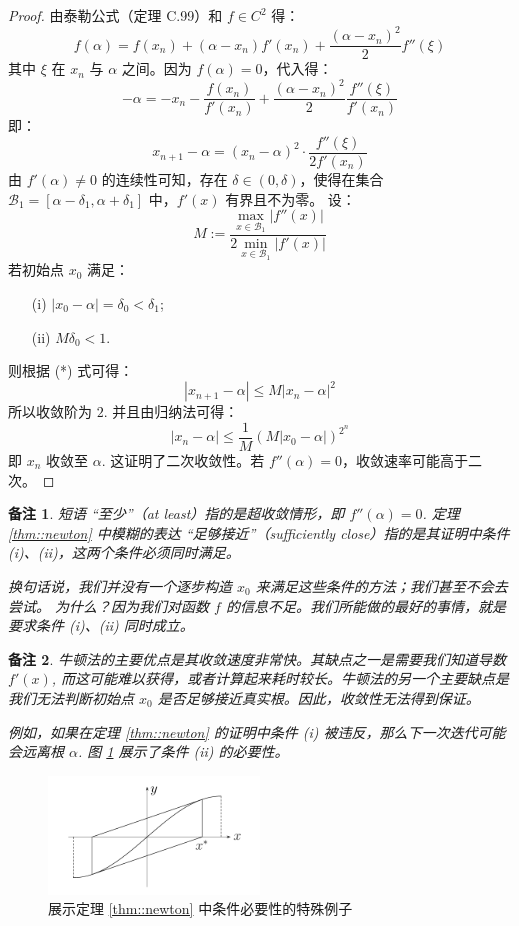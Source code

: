 \documentclass[a4paper]{ctexart}
\newtheorem{remark}{备注}
\numberwithin{theorem}{section}
\numberwithin{equation}{section}
\numberwithin{figure}{section}
\numberwithin{remark}{section}
\begin{document}
\begin{proof}
由泰勒公式（定理 C.99）和 \(f \in C^2\) 得：
\[
f(\alpha) = f(x_n) + (\alpha - x_n) f'(x_n) + \frac{(\alpha - x_n)^2}{2} f''(\xi)
\]
其中 \(\xi\) 在 \(x_n\) 与 \(\alpha\) 之间。因为 \(f(\alpha) = 0\)，代入得：
\[
- \alpha = - x_n - \frac{f(x_n)}{f'(x_n)} + \frac{(\alpha - x_n)^2}{2} \frac{f''(\xi)}{f'(x_n)}
\]
即：
\[
x_{n+1} - \alpha = (x_n - \alpha)^2 \cdot \frac{f''(\xi)}{2f'(x_n)} \tag{*}
\]
由 \(f'(\alpha) \ne 0\) 的连续性可知，存在 \(\delta \in (0, \delta)\)，使得在集合 
\(\mathcal{B}_1 = [\alpha - \delta_1, \alpha + \delta_1]\) 中，\(f'(x)\) 有界且不为零。
设：
\[
M := \frac{\max_{x \in \mathcal{B}_1} |f''(x)|}{2 \min_{x \in \mathcal{B}_1} |f'(x)|}
\]
若初始点 \(x_0\) 满足：
\begin{itemize}
    \item[(i)] \(|x_0 - \alpha| = \delta_0 < \delta_1\);
    \item[(ii)] \(M \delta_0 < 1\).
\end{itemize}
则根据 (*) 式可得：
\[
|x_{n+1} - \alpha| \le M |x_n - \alpha|^2
\]
所以收敛阶为 $2$. 并且由归纳法可得：
\[
|x_n - \alpha| \le \frac{1}{M} (M |x_0 - \alpha|)^{2^n}
\]
即 $x_n$ 收敛至 $\alpha$. 这证明了二次收敛性。若 \(f''(\alpha) = 0\)，收敛速率可能高于二次。 
\end{proof}

\begin{remark}
短语 “至少”（at least）指的是超收敛情形，即 \( f''(\alpha) = 0 \). 
定理 \ref{thm::newton} 中模糊的表达 “足够接近”（sufficiently close）指的是其证明中条件 (i)、(ii)，这两个条件必须同时满足。

换句话说，我们并没有一个逐步构造 \( x_0 \) 来满足这些条件的方法；我们甚至不会去尝试。
为什么？因为我们对函数 \( f \) 的信息不足。我们所能做的最好的事情，就是要求条件 (i)、(ii) 同时成立。
\end{remark}

\begin{remark}
牛顿法的主要优点是其收敛速度非常快。其缺点之一是需要我们知道导数 \( f'(x) \), 
而这可能难以获得，或者计算起来耗时较长。牛顿法的另一个主要缺点是我们无法判断初始点 \( x_0 \) 是否足够接近真实根。因此，收敛性无法得到保证。

例如，如果在定理 \ref{thm::newton} 的证明中条件 (i) 被违反，那么下一次迭代可能会远离根 \(\alpha\). 图 \ref{fig::newton_cond} 展示了条件 (ii) 的必要性。
\end{remark}

\begin{figure}
    \label{fig::newton_cond}
\centering
\includegraphics[width=0.5\textwidth]{images/newton_cond.png} %
\caption{展示定理 \ref{thm::newton} 中条件必要性的特殊例子}
\end{figure}
\end{document}
